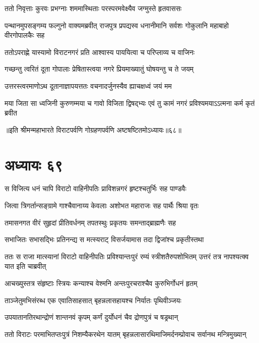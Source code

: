 
\twolineshloka
{ततो निवृत्ताः कुरवः प्रभग्नाः शममास्थिताः}
{परस्परमवेक्ष्यैव जग्मुस्ते हृतवाससः}


\threelineshloka
{पन्थानमुपसङ्गम्य फल्गुनो वाक्यमब्रवीत्}
{राजपुत्र प्रपद्यस्व धनानीमानि सर्वशः}
{गोकुलानि महाबाहो वीरगोपालकैः सह}


\twolineshloka
{ततोऽपराह्णे यास्यामो विराटनगरं प्रति}
{आश्वास्य पाययित्वा च परिप्लाव्य च वाजिनः}



\twolineshloka
{गच्छन्तु त्वरितं दूता गोपालाः प्रेषितास्त्वया}
{नगरे प्रियमाख्यातुं घोषयन्तु च ते जयम्}


\twolineshloka
{उत्तरस्त्वरमाणोऽथ दूतानाज्ञापयत्ततः}
{वचनादर्जुनस्यैव ह्याचक्षध्वं जयं मम}


\twolineshloka
{मया जिता सा ध्वजिनी कुरुणम्मया च गावो विजिता द्विषद्भ्यः}
{एवं तु कामं नगरं प्रविश्यमयाऽऽत्मना कर्म कृतं ब्रवीत}

॥इति श्रीमन्महाभारते विराटपर्वणि गोग्रहणपर्वणि अष्टषष्टितमोऽध्यायः॥६८॥

\chapter{अध्यायः ६९}

\twolineshloka
{स विजित्य धनं चापि विराटो वाहिनीपतिः}
{प्राविशन्नगरं हृष्टश्चतुर्भिः सह पाण्डवैः}


\twolineshloka
{जित्वा त्रिगर्तान्सङ्ग्रामे गाश्चैवानाय्य केवलाः}
{अशोभत महाराजः सह पार्थैः श्रिया वृतः}


\twolineshloka
{तमासनगत वीरं सुहृदां प्रीतिवर्धनम्}
{तपतस्थुः प्रकृतयः समन्ताद्ब्राह्मणैः सह}


\twolineshloka
{सभाजितः सभासद्भिः प्रतिनन्द्य स मत्स्यराट्}
{विसर्जयामास तदा द्विजांश्च प्रकृतीस्तथा}


\threelineshloka
{ततः स राजा मात्स्यानां विराटो वाहिनीपतिः}
{प्रविश्यान्तःपुरं रम्यं स्त्रीशतैरुपशोभितम्}
{उत्तरं तत्र नापश्यत्क्व यात इति चाब्रवीत्}


\twolineshloka
{आचख्युस्तत्र संहृष्टाः स्त्रियः कन्याश्च वेश्मनि}
{अन्तःपुरचराश्चैव कुरुभिर्गोधनं हृतम्}


\twolineshloka
{ताञ्जेतुमभिसंरब्ध एक एवातिसाहसात्}
{बृहन्नलासहायश्च निर्यातः पृथिवीञ्जयः}


\twolineshloka
{उपयातानतिरथान्द्रोणं शान्तनवं कृपम्}
{कर्णं दुर्योधनं चैव द्रोणपुत्रं च षड्रथान्}


\twolineshloka
{ततो विराटः परमाभितप्तःपुत्रं निशम्यैकरथेन यातम्}
{बृहन्नलासारथिमाजिमर्दनम्प्रोवाच सर्वानथ मन्त्रिमुख्यान्}


